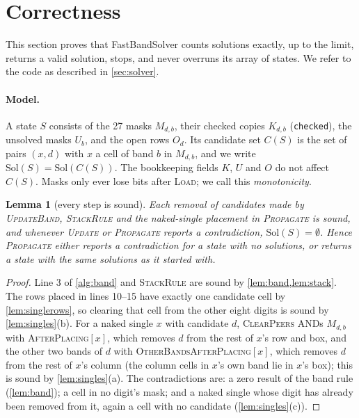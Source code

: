 \documentclass[11pt]{article}
\newtheorem{lemma}[theorem]{Lemma}
\theoremstyle{definition}
\theoremstyle{plain}
\let\origtextsc\textsc
\renewcommand{\textsc}[1]{\textup{\origtextsc{#1}}}
\begin{document}
\section{Correctness}
\label{sec:proofs}

This section proves that FastBandSolver counts solutions exactly, up to the limit, returns a valid solution, stops,
and never overruns its array of states. We refer to the code as described in \cref{sec:solver}.

\paragraph{Model.} A state $S$ consists of the 27 masks $M_{d,b}$, their checked copies $K_{d,b}$ (\texttt{checked}),
the unsolved masks $U_b$, and the open rows $O_d$. Its candidate set $C(S)$ is the set of pairs $(x,d)$ with $x$ a cell of
band $b$ in $M_{d,b}$, and we write $\mathrm{Sol}(S)=\mathrm{Sol}(C(S))$. The bookkeeping fields $K$, $U$ and $O$ do not
affect $C(S)$. Masks only ever lose bits after \textsc{Load}; we call this \emph{monotonicity}.

\begin{lemma}[every step is sound]
\label{lem:steps}
Each removal of candidates made by \textsc{UpdateBand}, \textsc{StackRule} and the naked-single placement in
\textsc{Propagate} is sound, and whenever \textsc{Update} or \textsc{Propagate} reports a contradiction,
$\mathrm{Sol}(S)=\emptyset$. Hence \textsc{Propagate} either reports a contradiction for a state with no solutions, or
returns a state with the same solutions as it started with.
\end{lemma}
\begin{proof}
Line 3 of \cref{alg:band} and \textsc{StackRule} are sound by \cref{lem:band,lem:stack}. The rows placed in lines
10--15 have exactly one candidate cell by \cref{lem:singlerows}, so clearing that cell from the other eight digits
is sound by \cref{lem:singles}(b). For a naked single $x$ with candidate $d$, \textsc{ClearPeers} ANDs $M_{d,b}$ with
\textsc{AfterPlacing}$[x]$, which removes $d$ from the rest of $x$'s row and box, and the other two bands of $d$ with
\textsc{OtherBandsAfterPlacing}$[x]$, which removes $d$ from the rest of $x$'s column (the column cells in $x$'s own band lie in
$x$'s box); this is sound by \cref{lem:singles}(a). The contradictions are: a zero result of the band rule
(\cref{lem:band}); a cell in no digit's mask; and a naked single whose digit has already been removed from it, again a
cell with no candidate (\cref{lem:singles}(c)).
\end{proof}
\end{document}
